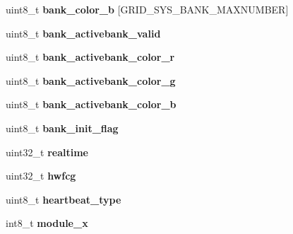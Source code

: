 \begin{DoxyCompactItemize}
\item 
\hypertarget{structgrid__sys__model_a8c21e43dac860a0d2bc625dabc64f665}{uint8\-\_\-t {\bfseries bank\-\_\-color\-\_\-b} \mbox{[}G\-R\-I\-D\-\_\-\-S\-Y\-S\-\_\-\-B\-A\-N\-K\-\_\-\-M\-A\-X\-N\-U\-M\-B\-E\-R\mbox{]}}\label{structgrid__sys__model_a8c21e43dac860a0d2bc625dabc64f665}

\item 
\hypertarget{structgrid__sys__model_a428dc3f5a56e9e01ae6587e663898fdb}{uint8\-\_\-t {\bfseries bank\-\_\-activebank\-\_\-valid}}\label{structgrid__sys__model_a428dc3f5a56e9e01ae6587e663898fdb}

\item 
\hypertarget{structgrid__sys__model_a3be2b03ef8baf8f960837989cc7e7f22}{uint8\-\_\-t {\bfseries bank\-\_\-activebank\-\_\-color\-\_\-r}}\label{structgrid__sys__model_a3be2b03ef8baf8f960837989cc7e7f22}

\item 
\hypertarget{structgrid__sys__model_a1d292071c840455544ec2d070d881f17}{uint8\-\_\-t {\bfseries bank\-\_\-activebank\-\_\-color\-\_\-g}}\label{structgrid__sys__model_a1d292071c840455544ec2d070d881f17}

\item 
\hypertarget{structgrid__sys__model_a56b5931408eb2ca0efe5f6c069b1750b}{uint8\-\_\-t {\bfseries bank\-\_\-activebank\-\_\-color\-\_\-b}}\label{structgrid__sys__model_a56b5931408eb2ca0efe5f6c069b1750b}

\item 
\hypertarget{structgrid__sys__model_ad888e33d8dc6713ea36d02e284c93449}{uint8\-\_\-t {\bfseries bank\-\_\-init\-\_\-flag}}\label{structgrid__sys__model_ad888e33d8dc6713ea36d02e284c93449}

\item 
\hypertarget{structgrid__sys__model_a79bf82ccbbf15650042e1085af733ee7}{uint32\-\_\-t {\bfseries realtime}}\label{structgrid__sys__model_a79bf82ccbbf15650042e1085af733ee7}

\item 
\hypertarget{structgrid__sys__model_ae633a605341b91dc7f6e99f2c555e4e2}{uint32\-\_\-t {\bfseries hwfcg}}\label{structgrid__sys__model_ae633a605341b91dc7f6e99f2c555e4e2}

\item 
\hypertarget{structgrid__sys__model_a0a3f91c7b84e578ce5b445aeb7a21de3}{uint8\-\_\-t {\bfseries heartbeat\-\_\-type}}\label{structgrid__sys__model_a0a3f91c7b84e578ce5b445aeb7a21de3}

\item 
\hypertarget{structgrid__sys__model_a4b47686af199de958cb2ecc6547df488}{int8\-\_\-t {\bfseries module\-\_\-x}}\label{structgrid__sys__model_a4b47686af199de958cb2ecc6547df488}


\end{DoxyCompactItemize}
